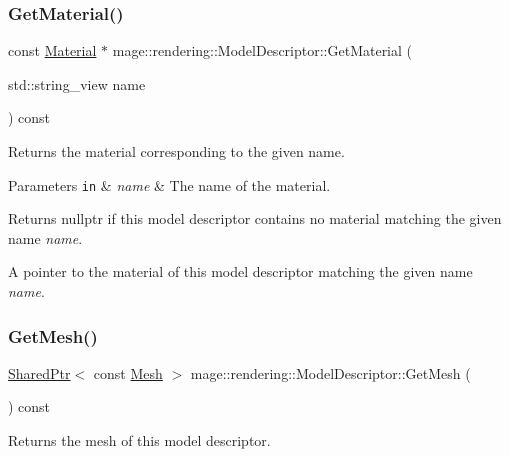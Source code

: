\subsubsection{\texorpdfstring{Get\+Material()}{GetMaterial()}}
{\footnotesize\ttfamily const \mbox{\hyperlink{classmage_1_1rendering_1_1_material}{Material}} $\ast$ mage\+::rendering\+::\+Model\+Descriptor\+::\+Get\+Material (\begin{DoxyParamCaption}\item[{std\+::string\+\_\+view}]{name }\end{DoxyParamCaption}) const\hspace{0.3cm}{\ttfamily [noexcept]}}

Returns the material corresponding to the given name.


\begin{DoxyParams}[1]{Parameters}
\mbox{\tt in}  & {\em name} & The name of the material. \\
\hline
\end{DoxyParams}
\begin{DoxyReturn}{Returns}
{\ttfamily nullptr} if this model descriptor contains no material matching the given name {\itshape name}. 

A pointer to the material of this model descriptor matching the given name {\itshape name}. 
\end{DoxyReturn}
\mbox{\label{classmage_1_1rendering_1_1_model_descriptor_a65645313d8b7bb976d1b5d0acdbbd38a}} 
\subsubsection{\texorpdfstring{Get\+Mesh()}{GetMesh()}}
{\footnotesize\ttfamily \mbox{\hyperlink{namespacemage_a1e01ae66713838a7a67d30e44c67703e}{Shared\+Ptr}}$<$ const \mbox{\hyperlink{classmage_1_1rendering_1_1_mesh}{Mesh}} $>$ mage\+::rendering\+::\+Model\+Descriptor\+::\+Get\+Mesh (\begin{DoxyParamCaption}{ }\end{DoxyParamCaption}) const\hspace{0.3cm}{\ttfamily [noexcept]}}

Returns the mesh of this model descriptor.


